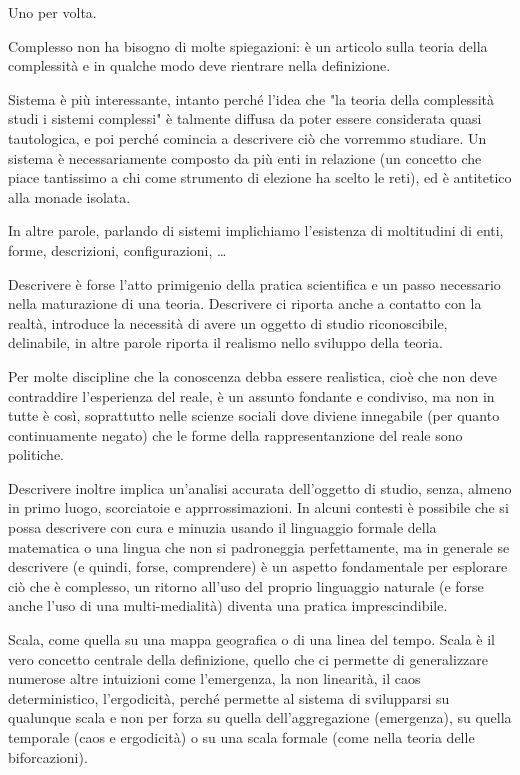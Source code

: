 \documentclass[a4paper, headings=standardclasses]{scrartcl}
\begin{document}
Uno per volta.

Complesso non ha bisogno di molte spiegazioni: è un articolo sulla teoria della complessità e in qualche modo deve rientrare nella definizione.

Sistema è più interessante, intanto perché l'idea che "la teoria della complessità studi i sistemi complessi" è talmente diffusa da poter essere considerata quasi tautologica, e poi perché comincia a descrivere ciò che vorremmo studiare.
Un sistema è necessariamente composto da più enti in relazione (un concetto che piace tantissimo a chi come strumento di elezione ha scelto le reti), ed è antitetico alla monade isolata.

In altre parole, parlando di sistemi implichiamo l'esistenza di moltitudini di enti, forme, descrizioni, configurazioni, \dots

Descrivere è forse l'atto primigenio della pratica scientifica e un passo necessario nella maturazione di una teoria. Descrivere ci riporta anche a contatto con la realtà, introduce la necessità di avere un oggetto di studio riconoscibile, delinabile, in altre parole riporta il realismo nello sviluppo della teoria.

Per molte discipline che la conoscenza debba essere realistica, cioè che non deve contraddire l'esperienza del reale, è un assunto fondante e condiviso, ma non in tutte è così, soprattutto nelle scienze sociali dove diviene innegabile (per quanto continuamente negato) che le forme della rappresentanzione del reale sono politiche.

Descrivere inoltre implica un'analisi accurata dell'oggetto di studio, senza, almeno in primo luogo, scorciatoie e apprrossimazioni. In alcuni contesti è possibile che si possa descrivere con cura e minuzia usando il linguaggio formale della matematica o una lingua che non si padroneggia perfettamente, ma in generale se descrivere (e quindi, forse, comprendere) è un aspetto fondamentale per esplorare ciò che è complesso, un ritorno all'uso del proprio linguaggio naturale (e forse anche l'uso di una multi-medialità) diventa una pratica imprescindibile.

Scala, come quella su una mappa geografica o di una linea del tempo.
Scala è il vero concetto centrale della definizione, quello che ci permette di generalizzare numerose altre intuizioni come l'emergenza, la non linearità, il caos deterministico, l'ergodicità, perché permette al sistema di svilupparsi su qualunque scala e non per forza su quella dell'aggregazione (emergenza), su quella temporale (caos e ergodicità) o su una scala formale (come nella teoria delle biforcazioni).
\end{document}
